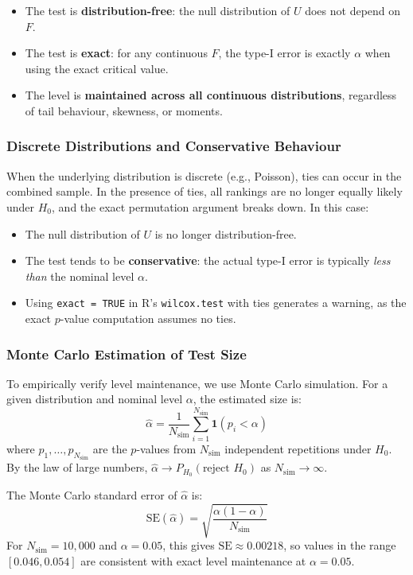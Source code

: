 \documentclass[10pt]{article}
\begin{document}
\begin{itemize}
    \item The test is \textbf{distribution-free}: the null distribution of $U$ does not depend on $F$.
    \item The test is \textbf{exact}: for any continuous $F$, the type-I error is exactly $\alpha$ when using the exact critical value.
    \item The level is \textbf{maintained across all continuous distributions}, regardless of tail behaviour, skewness, or moments.
\end{itemize}

\subsubsection{Discrete Distributions and Conservative Behaviour}

When the underlying distribution is discrete (e.g., Poisson), ties can occur in the combined sample. In the presence of ties, all rankings are no longer equally likely under $H_0$, and the exact permutation argument breaks down. In this case:
\begin{itemize}
    \item The null distribution of $U$ is no longer distribution-free.
    \item The test tends to be \textbf{conservative}: the actual type-I error is typically \textit{less than} the nominal level $\alpha$.
    \item Using \texttt{exact = TRUE} in R's \texttt{wilcox.test} with ties generates a warning, as the exact $p$-value computation assumes no ties.
\end{itemize}

\subsubsection{Monte Carlo Estimation of Test Size}

To empirically verify level maintenance, we use Monte Carlo simulation. For a given distribution and nominal level $\alpha$, the estimated size is:
\[
\widehat{\alpha} = \frac{1}{N_{\text{sim}}} \sum_{i=1}^{N_{\text{sim}}} \mathbf{1}(p_i < \alpha)
\]
where $p_1, \ldots, p_{N_{\text{sim}}}$ are the $p$-values from $N_{\text{sim}}$ independent repetitions under $H_0$. By the law of large numbers, $\widehat{\alpha} \to P_{H_0}(\text{reject } H_0)$ as $N_{\text{sim}} \to \infty$.

The Monte Carlo standard error of $\widehat{\alpha}$ is:
\[
\text{SE}(\widehat{\alpha}) = \sqrt{\frac{\alpha(1-\alpha)}{N_{\text{sim}}}}
\]
For $N_{\text{sim}} = 10{,}000$ and $\alpha = 0.05$, this gives $\text{SE} \approx 0.00218$, so values in the range $[0.046, 0.054]$ are consistent with exact level maintenance at $\alpha = 0.05$.
\end{document}
